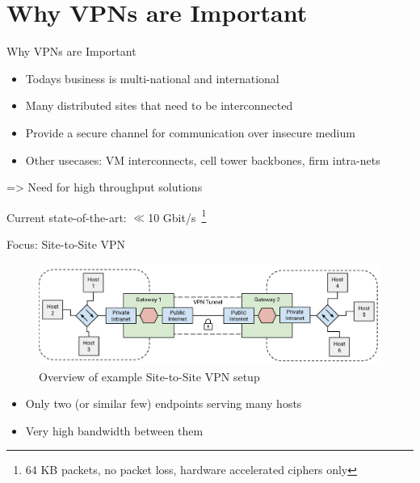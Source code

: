 \documentclass[NET,english]{tumbeamer}
\begin{document}

%

%

\section{Why VPNs are Important}
\begin{frame}{Why VPNs are Important}
	\begin{itemize}
		\item Todays business is multi-national and international
		\item Many distributed sites that need to be interconnected
		\item Provide a secure channel for communication over insecure medium
		\item Other usecases: VM interconnects, cell tower backbones, firm intra-nets
	\end{itemize}
	
	=> Need for high throughput solutions
	
	Current state-of-the-art: $\ll$10 Gbit/s~\footnote{64 KB packets, no packet loss, hardware accelerated ciphers only}
\end{frame}

\begin{frame}{Focus: Site-to-Site VPN}
	\begin{figure}
		\centering
		\includegraphics[width=1\linewidth]{figures/Site_to_Site_VPN}
		\caption{Overview of example Site-to-Site VPN setup}
		\label{fig:sitetositevpn}
	\end{figure}
	
	\begin{itemize}
		\item Only two (or similar few) endpoints serving many hosts
		\item Very high bandwidth between them
	\end{itemize}
\end{frame}
\end{document}
